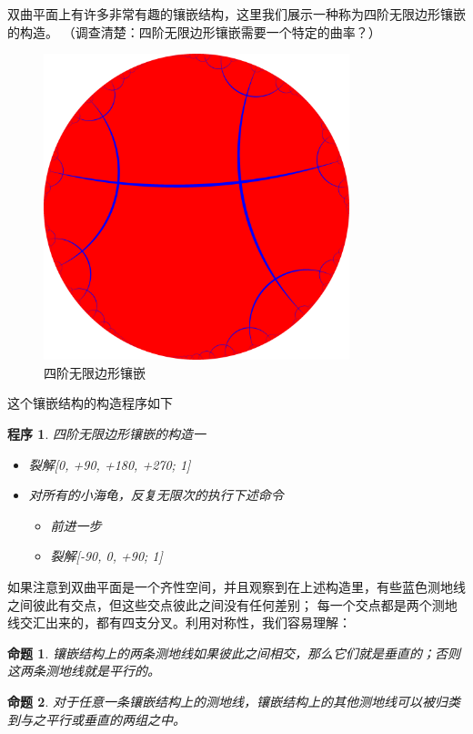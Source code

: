 \documentclass[a4paper,12pt]{article}
\newtheorem{proposition}{命题}
\newtheorem{program}{程序}
\begin{document}
双曲平面上有许多非常有趣的镶嵌结构，这里我们展示一种称为四阶无限边形镶嵌的构造。
（调查清楚：四阶无限边形镶嵌需要一个特定的曲率？）

\begin{figure}[ht]
\centering
\includegraphics[width=3.5in]{images/H2_tiling_24i-1.png}
\caption{四阶无限边形镶嵌}
\end{figure}

这个镶嵌结构的构造程序如下

\begin{program}
四阶无限边形镶嵌的构造一
\begin{itemize}
\item 裂解[0, +90, +180, +270; 1]
\item 对所有的小海龟，反复无限次的执行下述命令
\begin{itemize}\item 前进一步 \item 裂解[-90, 0, +90; 1] \end{itemize}
\end{itemize}
\end{program}

如果注意到双曲平面是一个齐性空间，并且观察到在上述构造里，有些蓝色测地线之间彼此有交点，但这些交点彼此之间没有任何差别；
每一个交点都是两个测地线交汇出来的，都有四支分叉。利用对称性，我们容易理解：

\begin{proposition}
\label{A}
镶嵌结构上的两条测地线如果彼此之间相交，那么它们就是垂直的；否则这两条测地线就是平行的。
\end{proposition}

\begin{proposition}
\label{B}
对于任意一条镶嵌结构上的测地线，镶嵌结构上的其他测地线可以被归类到与之平行或垂直的两组之中。
\end{proposition}
\end{document}
